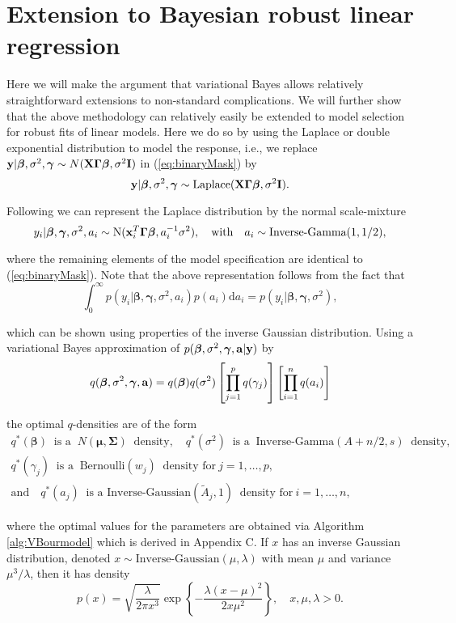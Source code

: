 \documentclass[11pt]{article}
\newtheorem{Main Result}{Main Result}
\def\vectorfontone{\bf}
\def\vectorfonttwo{\boldsymbol}
\def\va{{\vectorfontone a}}                      %
\def\vx{{\vectorfontone x}}                      %
\def\vy{{\vectorfontone y}}                      %
\def\vbeta{{\vectorfonttwo \beta}}               %
\def\vgamma{{\vectorfonttwo \gamma}}             %
\def\vmu{{\vectorfonttwo \mu}}                   %
\def\matrixfontone{\bf}
\def\matrixfonttwo{\boldsymbol}
\def\mI{{\matrixfontone I}}                      %
\def\mX{{\matrixfontone X}}                      %
\def\mGamma{{\matrixfonttwo \Gamma}}             %
\def\mSigma{{\matrixfonttwo \Sigma}}             %
\def\vmuq{{\vmu}}
\def\mSigmaq{{\mSigma}}
\def\Aq{{A+n/2}}
\def\Bq{{s}}
\newcommand{\joc}[1]{{\color{black}#1}}
\begin{document}
\joc{
\section{Extension to Bayesian robust linear regression}

Here we will make the argument that variational Bayes allows relatively
straightforward extensions to non-standard complications. We will further show that
the above methodology can relatively easily be extended to model selection for
robust fits of linear models. Here we do so by using the Laplace or double exponential
distribution to model the response, i.e., we replace
$\vy|\vbeta,\sigma^2,\vgamma \sim N(\mX\mGamma\vbeta,\sigma^2\mI)$ in 
(\ref{eq:binaryMask}) by
$$
\vy|\vbeta,\sigma^2,\vgamma \sim \mbox{Laplace}(\mX\mGamma\vbeta,\sigma^2\mI).
$$

\noindent Following \cite{AndrewsMallows1974} we can represent the Laplace distribution
by the normal scale-mixture
$$
y_i|\vbeta,\vgamma,\sigma^2,a_i\sim \mbox{N}(\vx_i^T\mGamma\vbeta,a_i^{-1}\sigma^2), \quad \mbox{with} \quad a_i\sim\mbox{Inverse-Gamma}(1,1/2),
$$

\noindent where the remaining elements of the model specification are identical to
(\ref{eq:binaryMask}). Note that the above representation follows from the fact that
$$
\int_0^\infty p(y_i|\vbeta,\vgamma,\sigma^2,a_i)p(a_i)\mbox{d}a_i = p(y_i|\vbeta,\vgamma,\sigma^2),
$$ 

\noindent which can be shown using properties of the inverse Gaussian distribution. 
Using a variational Bayes approximation of $p(\vbeta,\sigma^2,\vgamma,\va|\vy)$
by
$$
q(\vbeta,\sigma^2,\vgamma,\va ) 
= q(\vbeta)q(\sigma^2) \left[ \prod_{j=1}^p q(\gamma_j) \right] \left[ \prod_{i=1}^n q(a_i) \right]
$$

\noindent
the optimal $q$-densities are of the form
$$
\begin{array}{c}
q^{\ast}(\vbeta) \ \mbox{ is a } \ N(\vmuq,\mSigmaq) \ \mbox{ density}, \quad
q^{\ast}(\sigma^2) \ \mbox{ is a } \ \mbox{Inverse-Gamma}(\Aq,\Bq) \ \mbox{ density}, \\ [1ex]
q^{\ast}(\gamma_j)  \ \mbox{ is a } \  \mbox{Bernoulli}(w_j) \ \mbox{ density for} \ j=1,\ldots,p, \\ [1ex]
\mbox{and} \quad
q^{\ast}(a_j)  \ \mbox{ is a Inverse-Gaussian}(\widetilde{A}_j,1) \ \mbox{ density for} \ i=1,\ldots,n,
\end{array}
$$

\noindent where the optimal values for the parameters are obtained via Algorithm 
\ref{alg:VBourmodel} which is derived in Appendix C. If
$x$ has an inverse Gaussian distribution, denoted  
$x\sim \mbox{Inverse-Gaussian}(\mu,\lambda)$ with mean $\mu$ and variance 
$\mu^3/\lambda$, then it has density 
$$
p(x) = \sqrt{\frac{\lambda}{2\pi x^3}}
\exp\left\{ -\frac{\lambda(x - \mu)^2}{2x\mu^2}\right\}, 
\quad x,\mu,\lambda>0. 
$$

}
\end{document}
